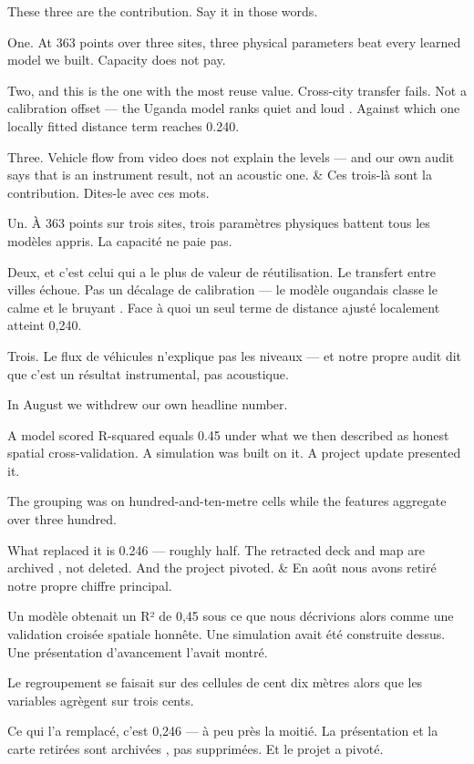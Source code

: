 \documentclass[10pt,a4paper]{article}
\begin{document}
\begin{say}
These three are the contribution. Say it in those words.

One. At 363 points over three sites, three physical parameters beat every learned
model we built. Capacity does not pay.

Two, and this is the one with the most reuse value. Cross-city transfer fails.
Not a calibration offset --- the Uganda model ranks quiet and loud . Against which one locally fitted distance term reaches 0.240.

Three. Vehicle flow from video does not explain the levels --- and our own audit
says that is an instrument result, not an acoustic one.
&
Ces trois-là sont la contribution. Dites-le avec ces mots.

Un. À 363 points sur trois sites, trois paramètres physiques battent tous les
modèles appris. La capacité ne paie pas.

Deux, et c'est celui qui a le plus de valeur de réutilisation. Le transfert entre
villes échoue. Pas un décalage de calibration --- le modèle ougandais classe le
calme et le bruyant . Face à quoi un seul terme de distance
ajusté localement atteint 0,240.

Trois. Le flux de véhicules n'explique pas les niveaux --- et notre propre audit
dit que c'est un résultat instrumental, pas acoustique.
\end{say}

\begin{say}
In August we withdrew our own headline number.

A model scored R-squared equals 0.45 under what we then described as honest
spatial cross-validation. A simulation was built on it. A project update
presented it.

The grouping was on hundred-and-ten-metre cells while the features aggregate over
three hundred. 

What replaced it is 0.246 --- roughly half. The retracted deck and map are
archived , not deleted. And the project pivoted.
&
En août nous avons retiré notre propre chiffre principal.

Un modèle obtenait un R² de 0,45 sous ce que nous décrivions alors comme une
validation croisée spatiale honnête. Une simulation avait été construite dessus.
Une présentation d'avancement l'avait montré.

Le regroupement se faisait sur des cellules de cent dix mètres alors que les
variables agrègent sur trois cents. 

Ce qui l'a remplacé, c'est 0,246 --- à peu près la moitié. La présentation et la
carte retirées sont archivées , pas supprimées. Et le
projet a pivoté.
\end{say}
\end{document}
